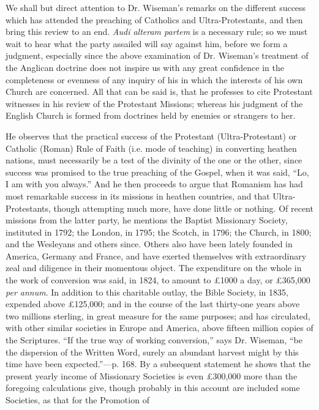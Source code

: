 We shall
but direct attention to Dr. Wiseman's remarks on the different success
which has attended the preaching of Catholics and Ultra-Protestants, and
then bring this review to an end. \emph{Audi alteram partem} is a
necessary rule; so we must wait to hear what the party assailed will say
against him, before we form a judgment, especially since the above
examination of Dr. Wiseman's treatment of the Anglican doctrine does
not inspire us with any great confidence in the completeness or evenness
of any inquiry of his in which the interests of his own Church are
concerned. All that can be said is, that he professes to cite Protestant
witnesses in his review of the Protestant Missions; whereas his judgment
of the English Church is formed from doctrines held by enemies or
strangers to her.

He observes
that the practical success of the Protestant (Ultra-Protestant) or
Catholic (Roman) Rule of Faith (i.e. mode of teaching) in converting
heathen nations, must necessarily be a test of the divinity
of the one or the other, since success was promised to the true
preaching of the Gospel, when it was said, ``Lo, I am with you always.''
And he then proceeds to argue that Romanism has had most remarkable
success in its missions in heathen countries, and that
Ultra-Protestants, though attempting much more, have done little or
nothing. Of recent missions from the latter party, he mentions the
Baptist Missionary Society, instituted in 1792; the London, in 1795; the
Scotch, in 1796; the Church, in 1800; and the Wesleyans and others
since. Others also have been lately founded in America, Germany and
France, and have exerted themselves with extraordinary zeal and
diligence in their momentous object. The expenditure on the whole in the
work of conversion was said, in 1824, to amount to £1000 a day, or £365,000
\emph{per annum}. In addition to this charitable outlay, the Bible
Society, in 1835, expended above £125,000; and in the course of the
last thirty-one years above two millions sterling, in great measure for
the same purposes; and has circulated, with other similar societies in
Europe and America, above fifteen million copies of the Scriptures. ``If
the true way of working conversion,'' says Dr. Wiseman, ``be the
dispersion of the Written Word, surely an abundant harvest might by this
time have been expected.''—p. 168. By a subsequent statement he shows
that the present yearly income of Missionary Societies is even £300,000
more than the foregoing calculations give, though probably in this
account are included some Societies, as that for the Promotion of

